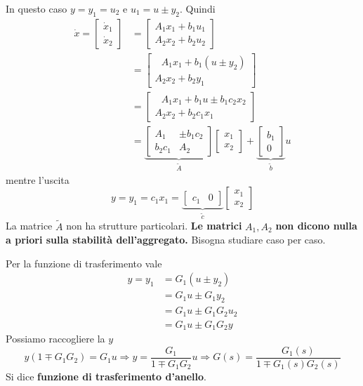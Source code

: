 \documentclass[10pt,a4paper]{book}
\begin{document}
In questo caso $y=y_1 =u_2$ e $u_1 =u\pm y_2$. Quindi
\begin{equation*}
\begin{aligned}
\dot{x} =\begin{bmatrix}
\dot{x}_1\\
\dot{x}_2
\end{bmatrix} & =\begin{bmatrix}
A_1 x_1 +b_1 u_1\\
A_2 x_2 +b_2 u_2
\end{bmatrix}\\
 & =\begin{bmatrix}
\ \ \ A_1 x_1 +b_1( u\pm y_2)\\
A_2 x_2 +b_2 y_1
\end{bmatrix}\\
 & =\begin{bmatrix}
\ \ \ A_1 x_1 +b_1 u\pm b_1 c_2 x_2\\
A_2 x_2 +b_2 c_1 x_1
\end{bmatrix}\\
 & =\underbrace{\begin{bmatrix}
A_1 & \pm b_1 c_2\\
b_2 c_1 & A_2
\end{bmatrix}}_{\tilde{A}}\begin{bmatrix}
x_1\\
x_2
\end{bmatrix} +\underbrace{\begin{bmatrix}
b_1\\
0
\end{bmatrix}}_{\tilde{b}} u
\end{aligned}
\end{equation*}
mentre l'uscita
\begin{equation*}
y=y_1 =c_1 x_1 =\underbrace{\begin{bmatrix}
c_1 & 0
\end{bmatrix}}_{\tilde{c}}\begin{bmatrix}
x_1\\
x_2
\end{bmatrix}
\end{equation*}
La matrice $\tilde{A}$ non ha strutture particolari. \textbf{Le matrici }$A_1 ,A_2$\textbf{ non dicono nulla a priori sulla stabilità dell'aggregato.} Bisogna studiare caso per caso.

Per la funzione di trasferimento vale
\begin{equation*}
\begin{aligned}
y=y_1 & =G_1\left( u\pm y_2\right)\\
 & =G_1 u\pm G_1 y_2\\
 & =G_1 u\pm G_1 G_2 u_2\\
 & =G_1 u\pm G_1 G_2 y
\end{aligned}
\end{equation*}
Possiamo raccogliere la $y$
\begin{equation*}
y\left( 1\mp G_1 G_2\right) =G_1 u\Rightarrow y=\frac{G_1}{1\mp G_1 G_2} u\Rightarrow \boxed{G\left( s\right) =\frac{G_1\left( s\right)}{1\mp G_1\left( s\right) G_2\left( s\right)}}
\end{equation*}
Si dice \textbf{funzione di trasferimento d'anello}.
\end{document}
